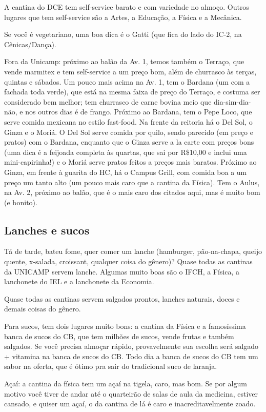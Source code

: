 \documentclass[a4paper,10pt, twocolumn]{article}
\begin{document}
A cantina do DCE tem self-service barato e com variedade no almoço. Outros
lugares que tem self-service são a Artes, a Educação, a Física e a Mecânica.

Se você é vegetariano, uma boa dica é o Gatti (que fica do lado do IC-2, na
Cênicas/Dança).

Fora da Unicamp: próximo ao balão da Av. 1, temos também o Terraço, que vende
marmitex e tem self-service a um preço bom, além de churrasco às terças, quintas
e sábados. Um pouco mais acima na Av. 1, tem o Bardana (um com a fachada toda
verde), que está na mesma faixa de preço do Terraço, e costuma ser considerado
bem melhor; tem churrasco de carne bovina meio que dia-sim-dia-não, e nos outros
dias é de frango. Próximo ao Bardana, tem o Pepe Loco, que serve comida mexicana
no estilo fast-food. Na frente da reitoria há o Del Sol, o Ginza e o Moriá.
O Del Sol serve comida por quilo, sendo parecido (em preço e pratos) com
o Bardana, enquanto que o Ginza serve a la carte com preços bons (uma dica
é a feijoada completa às quartas, que sai por R\$10,00 e inclui uma
mini-capirinha!) e o Moriá serve pratos feitos a preços mais baratos. Próximo ao
Ginza, em frente à guarita do HC, há o Campus Grill, com comida boa a um preço
um tanto alto (um pouco mais caro que a cantina da Física). Tem o Aulus, na Av.
2, próximo ao balão, que é o mais caro dos citados aqui, mas é muito bom (e
bonito).

\subsection{Lanches e sucos}

Tá de tarde, bateu fome, quer comer um lanche (hamburger, pão-na-chapa, queijo
quente, x-salada, croissant, qualquer coisa do gênero)? Quase todas as cantinas
da UNICAMP servem lanche. Algumas muito boas são o IFCH, a Física, a lanchonete
do IEL e a lanchonete da Economia.

Quase todas as cantinas servem salgados prontos, lanches naturais, doces
e demais coisas do gênero.

Para sucos, tem dois lugares muito bons: a cantina da Física e a famosíssima
banca de sucos do CB, que tem milhões de sucos, vende frutas e também salgados.
Se você precisa almoçar rápido, provavelmente sua escolha será salgado
+ vitamina na banca de sucos do CB. Todo dia a banca de sucos do CB tem um sabor
na oferta, que é ótimo pra sair do tradicional suco de laranja.

Açaí: a cantina da física tem um açaí na tigela, caro, mas bom. Se por algum
motivo você tiver de andar até o quarteirão de salas de aula da medicina,
estiver cansado, e quiser um açaí, o da cantina de lá é caro
e inacreditavelmente zoado.
\end{document}
